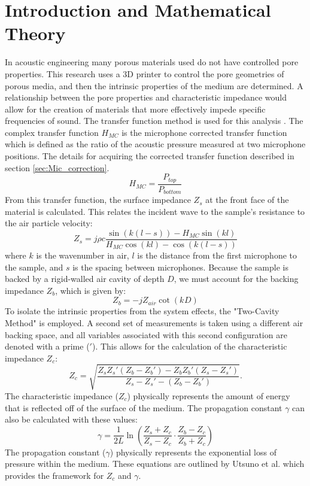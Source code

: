 \section{Introduction and Mathematical Theory}
In acoustic engineering many porous materials used do not have controlled pore properties. This research uses a 3D printer to control the pore geometries of porous media, and then the intrinsic properties of the medium are determined. A relationship between the pore properties and characteristic impedance would allow for the creation of materials that more effectively impede specific frequencies of sound. The transfer function method is used for this analysis \cite{utsuno1989}. The complex transfer function $H_{MC}$ is the microphone corrected transfer function which is defined as the ratio of the acoustic pressure measured at two microphone positions. The details for acquiring the corrected transfer function described in section \ref{sec:Mic_correction}.
\begin{equation}
    H_{MC} = \frac{P_{top}}{P_{bottom}}
    \label{eq: microphone corrected transfer function}
\end{equation}
From this transfer function, the surface impedance $Z_s$ at the front face of the material is calculated. This relates the incident wave to the sample's resistance to the air particle velocity:
\begin{equation}
    Z_s = j \rho c \frac{\sin(k(l-s)) - H_{MC} \sin(kl)}{H_{MC} \cos(kl) - \cos(k(l-s))}
\end{equation}
where $k$ is the wavenumber in air, $l$ is the distance from the first microphone to the sample, and $s$ is the spacing between microphones. Because the sample is backed by a rigid-walled air cavity of depth $D$, we must account for the backing impedance $Z_b$, which is given by:
\begin{equation}
    Z_b = -j Z_{air} \cot(k_{} D)
\end{equation}
To isolate the intrinsic properties from the system effects, the "Two-Cavity Method" is employed. A second set of measurements is taken using a different air backing space, and all variables associated with this second configuration are denoted with a prime ($'$). This allows for the calculation of the characteristic impedance $Z_c$:
\begin{equation}
    Z_c = \sqrt{\frac{Z_s Z_s' (Z_b - Z_b') - Z_b Z_b' (Z_s - Z_s')}{Z_s - Z_s' - (Z_b - Z_b')}}.
    \label{char_impedance}
\end{equation}
The characteristic impedance ($Z_c$) physically represents the amount of energy that is reflected off of the surface of the medium. The propagation constant $\gamma$ can also be calculated with these values:
\begin{equation}
    \gamma = \frac{1}{2L} \ln \left( \frac{Z_s + Z_c}{Z_s - Z_c} \cdot \frac{Z_b - Z_c}{Z_b + Z_c} \right)
    \label{prop_constant}
\end{equation}
The propagation constant ($\gamma$) physically represents the exponential loss of pressure within the medium. These equations are outlined by Utsuno et al. \cite{utsuno1989} which provides the framework for $Z_c$ and $\gamma$.

